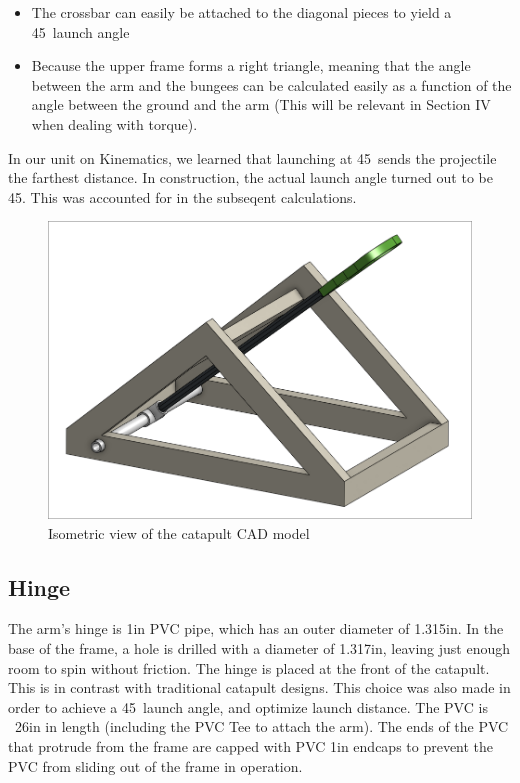 \documentclass[10pt]{article}
\begin{document}
\begin{flushleft}
    \begin{itemize}
      \item The crossbar can easily be attached to the diagonal pieces to yield a 45\textdegree \ launch angle
      \item Because the upper frame forms a right triangle, meaning that the angle between the arm and the bungees can be calculated easily as a function of the angle between the ground and the arm (This will be relevant in Section IV when dealing with torque).
    \end{itemize}

    In our unit on Kinematics, we learned that launching at 45\textdegree \ sends the projectile the farthest distance.
    In construction, the actual launch angle turned out to be 45\textdegree.
    This was accounted for in the subseqent calculations.
  
    \begin{figure}
      \caption{Isometric view of the catapult CAD model}
      \centering \includegraphics[width=5.0in, trim= 4 4 4 4, clip]{isometric}
    \end{figure}
  
  \subsection{Hinge}
    \par
    The arm's hinge is 1in PVC pipe, which has an outer diameter of 1.315in.
    In the base of the frame, a hole is drilled with a diameter of 1.317in, leaving just enough room to spin without friction.
    The hinge is placed at the front of the catapult.
    This is in contrast with traditional catapult designs.
    This choice was also made in order to achieve a 45\textdegree \ launch angle, and optimize launch distance.
    The PVC is ~26in in length (including the PVC Tee to attach the arm).
    The ends of the PVC that protrude from the frame are capped with PVC 1in endcaps to prevent the PVC from sliding out of the frame in operation.


\end{flushleft}
\end{document}
